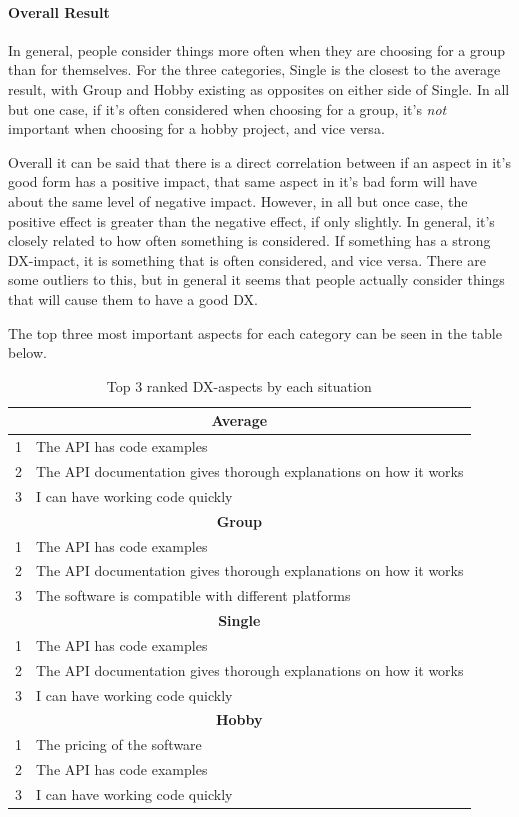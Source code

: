 \documentclass{article}
\begin{document}
\paragraph{Overall Result}

In general, people consider things more often when they are choosing for
a group than for themselves. For the three categories, Single is the
closest to the average result, with Group and Hobby existing as
opposites on either side of Single. In all but one case, if it's often
considered when choosing for a group, it's \textit{not} important when choosing
for a hobby project, and vice versa.

Overall it can be said that there is a direct correlation between if an
aspect in it's good form has a positive impact, that same aspect in it's
bad form will have about the same level of negative impact. However, in
all but once case, the positive effect is greater than the negative
effect, if only slightly. In general, it's closely related to how often
something is considered. If something has a strong DX-impact, it is
something that is often considered, and vice versa. There are some
outliers to this, but in general it seems that people actually consider
things that will cause them to have a good DX.

The top three most important aspects for each category can be seen in
the table below.

\begin{table}[H]
\centering
\begin{tabular}{r l}
\hline\hline
\multicolumn{2}{c}{\textbf{Average}} \\ \hline
1 &The API has code examples \\
2 & The API documentation gives thorough explanations on how it works \\
3 &I can have working code quickly \\
\hline\hline
\multicolumn{2}{c}{\textbf{Group}} \\ \hline
1 & The API has code examples                                        \\
2 & The API documentation gives thorough explanations on how it works \\
3 & The software is compatible with different platforms              \\
\hline\hline
\multicolumn{2}{c}{\textbf{Single}} \\ \hline
1 &  The API has code examples                                         \\
2 &  The API documentation gives thorough explanations on how it works  \\
3 &  I can have working code quickly                                   \\
\hline\hline
\multicolumn{2}{c}{\textbf{Hobby}} \\ \hline
1 & The pricing of the software    \\
2 & The API has code examples       \\
3 & I can have working code quickly\\ \hline
\end{tabular}
\caption{Top 3 ranked DX-aspects by each situation}
\label{tab:my_label}
\end{table}
\end{document}
